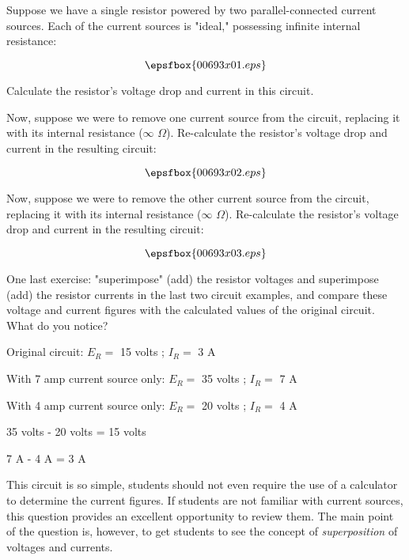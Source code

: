 

Suppose we have a single resistor powered by two parallel-connected current sources.  Each of the current sources is "ideal," possessing infinite internal resistance:

$$\epsfbox{00693x01.eps}$$

Calculate the resistor's voltage drop and current in this circuit.

\vskip 10pt

Now, suppose we were to remove one current source from the circuit, replacing it with its internal resistance ($\infty$ $\Omega$).  Re-calculate the resistor's voltage drop and current in the resulting circuit:

$$\epsfbox{00693x02.eps}$$

\vskip 10pt

Now, suppose we were to remove the other current source from the circuit, replacing it with its internal resistance ($\infty$ $\Omega$).  Re-calculate the resistor's voltage drop and current in the resulting circuit:

$$\epsfbox{00693x03.eps}$$

\vskip 10pt

One last exercise: "superimpose" (add) the resistor voltages and superimpose (add) the resistor currents in the last two circuit examples, and compare these voltage and current figures with the calculated values of the original circuit.  What do you notice?







Original circuit: $E_R =$ 15 volts ; $I_R =$ 3 A

\vskip 10pt

With 7 amp current source only: $E_R =$ 35 volts ; $I_R =$ 7 A

\vskip 10pt

With 4 amp current source only: $E_R =$ 20 volts ; $I_R =$ 4 A

\vskip 10pt

35 volts - 20 volts = 15 volts

7 A - 4 A = 3 A







This circuit is so simple, students should not even require the use of a calculator to determine the current figures.  If students are not familiar with current sources, this question provides an excellent opportunity to review them.  The main point of the question is, however, to get students to see the concept of {\it superposition} of voltages and currents.




